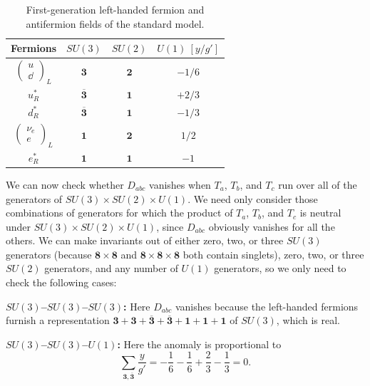 \begin{table}[htbp]
 \centering
 \begingroup
 \renewcommand{\thetable}{22.1}
 \caption{First-generation left-handed fermion and antifermion fields of
 the standard model.}
 \label{tab:22.1}
 \renewcommand{\arraystretch}{1.35}
 \begin{tabular}{c@{\qquad}c@{\qquad}c@{\qquad}c}
  \hline\hline
  Fermions & $SU(3)$ & $SU(2)$ & $U(1)\ [y/g']$\\
  \hline
  $\begin{pmatrix}u\\ \dd\end{pmatrix}_{\!L}$
    & $\mathbf 3$ & $\mathbf 2$ & $-1/6$\\
  $u_R^*$ & $\overline{\mathbf 3}$ & $\mathbf{1}$ & $+2/3$\\
  $d_R^*$ & $\overline{\mathbf 3}$ & $\mathbf{1}$ & $-1/3$\\
  $\begin{pmatrix}\nu_e\\ e\end{pmatrix}_{\!L}$
    & $\mathbf{1}$ & $\mathbf 2$ & $1/2$\\
  $e_R^*$ & $\mathbf{1}$ & $\mathbf{1}$ & $-1$\\
  \hline\hline
 \end{tabular}
 \endgroup
\end{table}

We can now check whether $D_{abc}$ vanishes when $T_a$,
$T_b$, and $T_c$ run over all of the generators of
$SU(3)\times SU(2)\times U(1)$. We need only consider those combinations of
generators for which the product of $T_a$, $T_b$, and $T_c$
is neutral under $SU(3)\times SU(2)\times U(1)$, since
$D_{abc}$ obviously vanishes for all the others. We can make
invariants out of either zero, two, or three $SU(3)$ generators (because
$\mathbf8\times\mathbf8$ and
$\mathbf8\times\mathbf8\times\mathbf8$ both contain singlets), zero, two, or
three $SU(2)$ generators, and any number of $U(1)$ generators, so we only
need to check the following cases:

\noindent\textbf{\boldmath$SU(3)$--$SU(3)$--$SU(3)$:}
Here $D_{abc}$ vanishes because the left-handed fermions
furnish a representation
$\mathbf3+\mathbf3+\overline{\mathbf3}+\overline{\mathbf3}
+\mathbf{1}+\mathbf{1}+\mathbf{1}$ of $SU(3)$, which is real.

\noindent\textbf{\boldmath$SU(3)$--$SU(3)$--$U(1)$:}
Here the anomaly is proportional to
\[
 \sum_{\mathbf3,\overline{\mathbf3}}\frac{y}{g'}
 =-\frac{1}{6}-\frac{1}{6}+\frac{2}{3}-\frac{1}{3}=0.
\]

